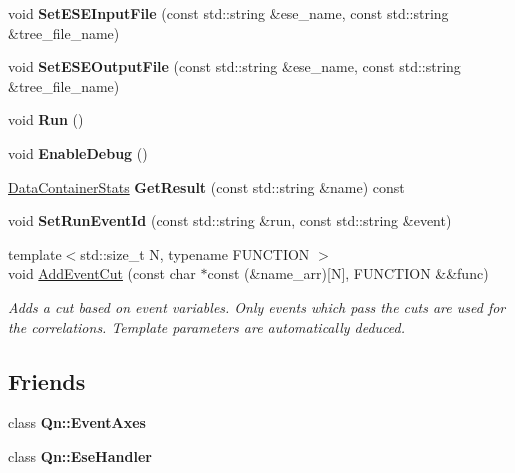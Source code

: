 \begin{DoxyCompactItemize}
\item 
\mbox{\label{classQn_1_1CorrelationManager_a7125ed4af86e08cefe9b8bd7acb321bc}} 
void {\bfseries Set\+E\+S\+E\+Input\+File} (const std\+::string \&ese\+\_\+name, const std\+::string \&tree\+\_\+file\+\_\+name)
\item 
\mbox{\label{classQn_1_1CorrelationManager_a8a4022902df6eaa4070ebb087702395c}} 
void {\bfseries Set\+E\+S\+E\+Output\+File} (const std\+::string \&ese\+\_\+name, const std\+::string \&tree\+\_\+file\+\_\+name)
\item 
\mbox{\label{classQn_1_1CorrelationManager_ab8e4d3e6f2c311cadb53578be73bf049}} 
void {\bfseries Run} ()
\item 
\mbox{\label{classQn_1_1CorrelationManager_a853beec782f1f56c7f15a028f0c676ca}} 
void {\bfseries Enable\+Debug} ()
\item 
\mbox{\label{classQn_1_1CorrelationManager_ad637bdaed17f37c202c0b50e319d167c}} 
\mbox{\hyperlink{classQn_1_1DataContainer}{Data\+Container\+Stats}} {\bfseries Get\+Result} (const std\+::string \&name) const
\item 
\mbox{\label{classQn_1_1CorrelationManager_ae7a50205d3ce4ca7420c0f4241681d2b}} 
void {\bfseries Set\+Run\+Event\+Id} (const std\+::string \&run, const std\+::string \&event)
\item 
{\footnotesize template$<$std\+::size\+\_\+t N, typename F\+U\+N\+C\+T\+I\+ON $>$ }\\void \mbox{\hyperlink{classQn_1_1CorrelationManager_ae60f0303106e4ce9e30d62a9a4008108}{Add\+Event\+Cut}} (const char $\ast$const (\&name\+\_\+arr)\mbox{[}N\mbox{]}, F\+U\+N\+C\+T\+I\+ON \&\&func)
\begin{DoxyCompactList}\small\item\em Adds a cut based on event variables. Only events which pass the cuts are used for the correlations. Template parameters are automatically deduced. \end{DoxyCompactList}\end{DoxyCompactItemize}
\subsection*{Friends}
\begin{DoxyCompactItemize}
\item 
\mbox{\label{classQn_1_1CorrelationManager_aa1daf174c272834005e68fc462dfb524}} 
class {\bfseries Qn\+::\+Event\+Axes}
\item 
\mbox{\label{classQn_1_1CorrelationManager_ae2be1c188e0c6ef484f6dde5ec110d8f}} 
class {\bfseries Qn\+::\+Ese\+Handler}
\end{DoxyCompactItemize}


